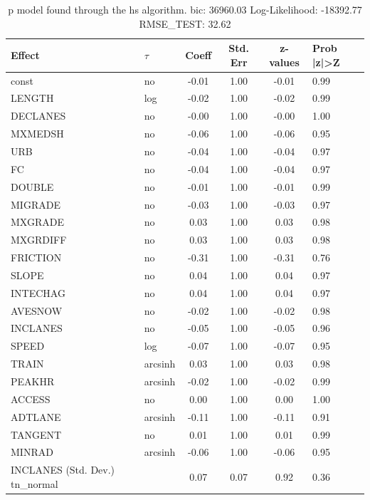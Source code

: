\begin{table}
	\caption{p model found through the hs algorithm. bic: 36960.03 Log-Likelihood: -18392.77 RMSE_TEST: 32.62}
	\begin{center}
		\begin{tabular}{|l|l|c|c|c|l|}
			\hline
			Effect & $\tau$ & Coeff & Std. Err & z-values & Prob |z|>Z \\
			\hline
			const & no & -0.01 & 1.00 & -0.01 & 0.99 \\
			\hline
			LENGTH & log & -0.02 & 1.00 & -0.02 & 0.99 \\
			\hline
			DECLANES & no & -0.00 & 1.00 & -0.00 & 1.00 \\
			\hline
			MXMEDSH & no & -0.06 & 1.00 & -0.06 & 0.95 \\
			\hline
			URB & no & -0.04 & 1.00 & -0.04 & 0.97 \\
			\hline
			FC & no & -0.04 & 1.00 & -0.04 & 0.97 \\
			\hline
			DOUBLE & no & -0.01 & 1.00 & -0.01 & 0.99 \\
			\hline
			MIGRADE & no & -0.03 & 1.00 & -0.03 & 0.97 \\
			\hline
			MXGRADE & no & 0.03 & 1.00 & 0.03 & 0.98 \\
			\hline
			MXGRDIFF & no & 0.03 & 1.00 & 0.03 & 0.98 \\
			\hline
			FRICTION & no & -0.31 & 1.00 & -0.31 & 0.76 \\
			\hline
			SLOPE & no & 0.04 & 1.00 & 0.04 & 0.97 \\
			\hline
			INTECHAG & no & 0.04 & 1.00 & 0.04 & 0.97 \\
			\hline
			AVESNOW & no & -0.02 & 1.00 & -0.02 & 0.98 \\
			\hline
			INCLANES & no & -0.05 & 1.00 & -0.05 & 0.96 \\
			\hline
			SPEED & log & -0.07 & 1.00 & -0.07 & 0.95 \\
			\hline
			TRAIN & arcsinh & 0.03 & 1.00 & 0.03 & 0.98 \\
			\hline
			PEAKHR & arcsinh & -0.02 & 1.00 & -0.02 & 0.99 \\
			\hline
			ACCESS & no & 0.00 & 1.00 & 0.00 & 1.00 \\
			\hline
			ADTLANE & arcsinh & -0.11 & 1.00 & -0.11 & 0.91 \\
			\hline
			TANGENT & no & 0.01 & 1.00 & 0.01 & 0.99 \\
			\hline
			MINRAD & arcsinh & -0.06 & 1.00 & -0.06 & 0.95 \\
			\hline
			INCLANES (Std. Dev.) tn_normal &  & 0.07 & 0.07 & 0.92 & 0.36 \\

\end{tabular}
\end{center}
\end{table}
